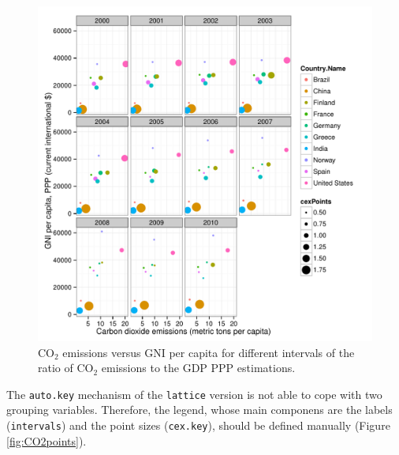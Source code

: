 \documentclass[smallroyalvopaper]{memoir}
\begin{document}
\begin{figure}[htbp]
\centering
\includegraphics[width=.9\linewidth]{figs/CO2pointsGG.pdf}
\caption{\(\mathrm{CO_2}\) emissions versus GNI per capita for different intervals of the ratio of \(\mathrm{CO_2}\) emissions to the GDP PPP estimations. \label{fig:CO2pointsGG}}
\end{figure}

The \texttt{auto.key} mechanism of the \texttt{lattice} version is not able to cope with two grouping variables. Therefore, the legend, whose main componens are the labels (\texttt{intervals}) and the point sizes (\texttt{cex.key}), should be defined manually (Figure \ref{fig:CO2points}). 

\end{document}
